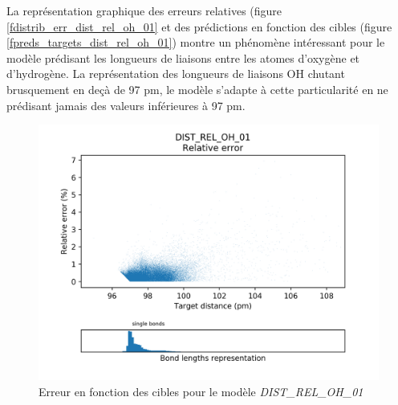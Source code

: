 \par La représentation graphique des erreurs relatives (figure \ref{fdistrib_err_dist_rel_oh_01} et des prédictions en fonction des cibles (figure \ref{fpreds_targets_dist_rel_oh_01}) montre un phénomène intéressant pour le modèle prédisant les longueurs de liaisons entre les atomes d'oxygène et d'hydrogène. La représentation des longueurs de liaisons OH chutant brusquement en deçà de 97 pm, le modèle s'adapte à cette particularité en ne prédisant jamais des valeurs inférieures à 97 pm.

\begin{figure}
	\centering
	
	\includegraphics[scale=0.7]{../figures/DIST_REL_OH_01/DIST_REL_OH_01_distrib_rmse_dist.png}	
	
	\caption{Erreur en fonction des cibles pour le modèle \emph{DIST\_REL\_OH\_01}}
	\label{fdistrib_err_rel_dist_rel_oh_01}
	\end{figure}
	
